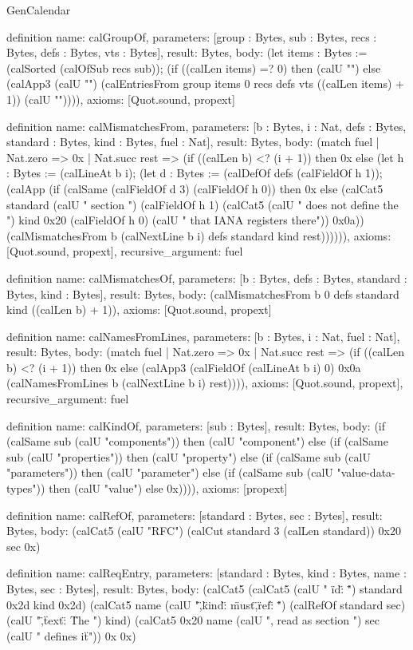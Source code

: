 \begin{lexlean}{GenCalendar}
\begin{semanticmodule}
definition{
  name: calGroupOf,
  parameters: [group : Bytes, sub : Bytes, recs : Bytes, defs : Bytes, vts : Bytes],
  result: Bytes,
  body: (let items : Bytes := (calSorted (calOfSub recs sub)); (if ((calLen items) =? 0) then (calU "{}") else (calApp3 (calU "{\n") (calEntriesFrom group items 0 recs defs vts ((calLen items) + 1)) (calU "\n }")))),
  axioms: [Quot.sound, propext]
}

definition{
  name: calMismatchesFrom,
  parameters: [b : Bytes, i : Nat, defs : Bytes, standard : Bytes, kind : Bytes, fuel : Nat],
  result: Bytes,
  body: (match fuel
    | Nat.zero => 0x
    | Nat.succ rest => (if ((calLen b) <? (i + 1)) then 0x else (let h : Bytes := (calLineAt b i); (let d : Bytes := (calDefOf defs (calFieldOf h 1)); (calApp (if (calSame (calFieldOf d 3) (calFieldOf h 0)) then 0x else (calCat5 standard (calU " section ") (calFieldOf h 1) (calCat5 (calU " does not define the ") kind 0x20 (calFieldOf h 0) (calU " that IANA registers there")) 0x0a)) (calMismatchesFrom b (calNextLine b i) defs standard kind rest)))))),
  axioms: [Quot.sound, propext],
  recursive_argument: fuel
}

definition{
  name: calMismatchesOf,
  parameters: [b : Bytes, defs : Bytes, standard : Bytes, kind : Bytes],
  result: Bytes,
  body: (calMismatchesFrom b 0 defs standard kind ((calLen b) + 1)),
  axioms: [Quot.sound, propext]
}

definition{
  name: calNamesFromLines,
  parameters: [b : Bytes, i : Nat, fuel : Nat],
  result: Bytes,
  body: (match fuel
    | Nat.zero => 0x
    | Nat.succ rest => (if ((calLen b) <? (i + 1)) then 0x else (calApp3 (calFieldOf (calLineAt b i) 0) 0x0a (calNamesFromLines b (calNextLine b i) rest)))),
  axioms: [Quot.sound, propext],
  recursive_argument: fuel
}

definition{
  name: calKindOf,
  parameters: [sub : Bytes],
  result: Bytes,
  body: (if (calSame sub (calU "components")) then (calU "component") else (if (calSame sub (calU "properties")) then (calU "property") else (if (calSame sub (calU "parameters")) then (calU "parameter") else (if (calSame sub (calU "value-data-types")) then (calU "value") else 0x)))),
  axioms: [propext]
}

definition{
  name: calRefOf,
  parameters: [standard : Bytes, sec : Bytes],
  result: Bytes,
  body: (calCat5 (calU "RFC") (calCut standard 3 (calLen standard)) 0x20 sec 0x)
}

definition{
  name: calReqEntry,
  parameters: [standard : Bytes, kind : Bytes, name : Bytes, sec : Bytes],
  result: Bytes,
  body: (calCat5 (calCat5 (calU " {\n  \"id\": \"") standard 0x2d kind 0x2d) (calCat5 name (calU "\",\n  \"kind\": \"must\",\n  \"ref\": \"") (calRefOf standard sec) (calU "\",\n  \"text\": \"The ") kind) (calCat5 0x20 name (calU ", read as section ") sec (calU " defines it\"\n }")) 0x 0x)
}


\end{semanticmodule}
\end{lexlean}
